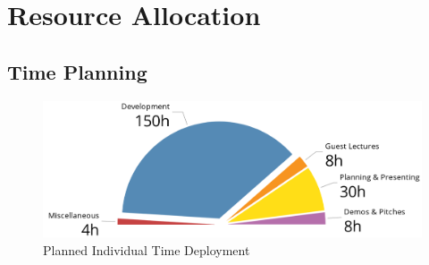 \documentclass[a4paper,10pt,DIV10,openright,openbib]{scrreprt}
\begin{document}
{\let\clearpage\relax \chapter{Resource Allocation}}


\section{Time Planning}

\begin{figure}[h]
  \includegraphics[width=\textwidth]{pie.png}
  \caption{Planned Individual Time Deployment}
  \label{piec}
\end{figure}
\end{document}
